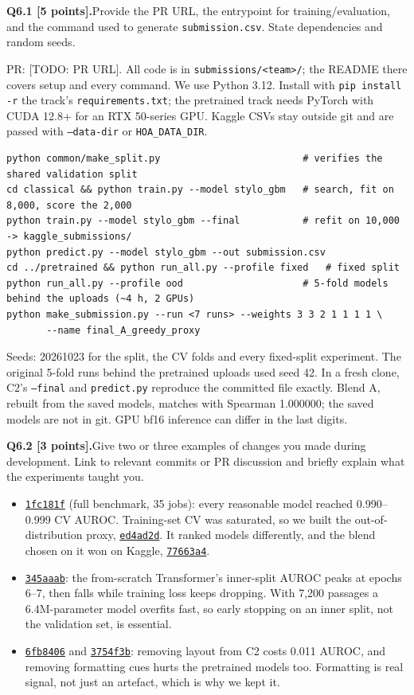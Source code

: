 \documentclass[11pt,letterpaper]{article}
\newcommand{\question}[2]{\needspace{4\baselineskip}\par\addvspace{0.45em}\noindent\textbf{#1}\quad #2\par\nobreak\vspace{0.1em}}
\newcommand{\commit}[2]{\href{https://github.com/ZhenmanShen/human-or-ai-submissions/commit/#1}{\texttt{#2}}}
\begin{document}
\question{Q6.1 [5 points].}{Provide the PR URL, the entrypoint for training/evaluation, and the command used to generate \texttt{submission.csv}. State dependencies and random seeds.}
PR: [TODO: PR URL]. All code is in \texttt{submissions/<team>/}; the README there covers setup and every command. We use Python 3.12. Install with \texttt{pip install -r} the track's \texttt{requirements.txt}; the pretrained track needs PyTorch with CUDA 12.8+ for an RTX 50-series GPU. Kaggle CSVs stay outside git and are passed with \texttt{--data-dir} or \texttt{HOA\_DATA\_DIR}.
{\footnotesize\begin{verbatim}
python common/make_split.py                         # verifies the shared validation split
cd classical && python train.py --model stylo_gbm   # search, fit on 8,000, score the 2,000
python train.py --model stylo_gbm --final           # refit on 10,000 -> kaggle_submissions/
python predict.py --model stylo_gbm --out submission.csv
cd ../pretrained && python run_all.py --profile fixed   # fixed split
python run_all.py --profile ood                     # 5-fold models behind the uploads (~4 h, 2 GPUs)
python make_submission.py --run <7 runs> --weights 3 3 2 1 1 1 1 \
       --name final_A_greedy_proxy
\end{verbatim}}
{\raggedright Seeds: 20261023 for the split, the CV folds and every fixed-split experiment. The original 5-fold runs behind the pretrained uploads used seed 42. In a fresh clone, C2's \texttt{--final} and \texttt{predict.py} reproduce the committed file exactly. Blend A, rebuilt from the saved models, matches with Spearman 1.000000; the saved models are not in git. GPU bf16 inference can differ in the last digits.\par}

\question{Q6.2 [3 points].}{Give two or three examples of changes you made during development. Link to relevant commits or PR discussion and briefly explain what the experiments taught you.}
\begin{itemize}
\item \commit{1fc181fef044ef79830a9a0db09f32bc305f38e0}{1fc181f} (full benchmark, 35 jobs): every reasonable model reached 0.990--0.999 CV AUROC. Training-set CV was saturated, so we built the out-of-distribution proxy, \commit{ed4ad2daeabbb6f05fc791791dff0edf34ced42e}{ed4ad2d}. It ranked models differently, and the blend chosen on it won on Kaggle, \commit{77663a46bfcbc667df49d3aeb81d00485319b2f8}{77663a4}.
\item \commit{345aaab6ff162b0dd75461b219afda13866aed63}{345aaab}: the from-scratch Transformer's inner-split AUROC peaks at epochs 6--7, then falls while training loss keeps dropping. With 7,200 passages a 6.4M-parameter model overfits fast, so early stopping on an inner split, not the validation set, is essential.
\item \commit{6fb8406709d375571d760b4d23b11a131c61c44e}{6fb8406} and \commit{3754f3b7f2d07855ff6e01a9ef753e7f575d4698}{3754f3b}: removing layout from C2 costs 0.011 AUROC, and removing formatting cues hurts the pretrained models too. Formatting is real signal, not just an artefact, which is why we kept it.
\end{itemize}
\end{document}
